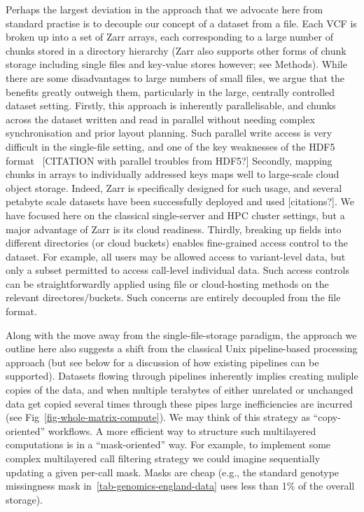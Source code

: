 \documentclass[a4paper,num-refs]{oup-contemporary}
\begin{document}
Perhaps the largest deviation in the approach that we advocate here 
from standard practise is to decouple our concept of a dataset from
a file. Each VCF is broken up into a set of Zarr arrays, each 
corresponding to a large number of chunks stored in a directory
hierarchy (Zarr also supports other forms of chunk storage 
including single files and key-value stores however; see Methods).
While there are some disadvantages to large numbers of small files,
we argue that the benefits greatly outweigh them, particularly 
in the large, centrally controlled dataset setting. 
Firstly, this approach is inherently parallelisable, and chunks across the 
dataset written and read in parallel without needing complex 
synchronisation and prior layout planning. 
Such parallel write access is very difficult 
in the single-file setting, and one of the key weaknesses 
of the HDF5 format~\citep{folk2011overview} [CITATION with 
parallel troubles from HDF5?]
Secondly, mapping chunks in arrays to individually addressed
keys maps well to large-scale cloud object storage. Indeed,
Zarr is specifically designed for such usage, and 
several petabyte scale datasets have been successfully deployed
and used [citations?].
We have focused here on the classical single-server and 
HPC cluster settings, but a major advantage of Zarr is 
its cloud readiness.
Thirdly, breaking up fields into different directories (or 
cloud buckets) enables fine-grained access control to the 
dataset. For example, all users may be allowed access to
variant-level data, but only a subset permitted to access
call-level individual data. Such access controls can be 
straightforwardly applied using file or cloud-hosting 
methods on the relevant directores/buckets. Such concerns
are entirely decoupled from the file format.

Along with the move away from the single-file-storage paradigm,
the approach we outline here also suggests a shift from 
the classical Unix pipeline-based processing approach 
(but see below for a discussion of how existing pipelines can
be supported). Datasets flowing through pipelines inherently 
implies creating muliple copies of the data, and when 
multiple terabytes of either unrelated or unchanged data 
get copied several times through these pipes large inefficiencies 
are incurred (see Fig~\ref{fig-whole-matrix-compute}). 
We may think of this strategy as ``copy-oriented'' workflows.
A more efficient way to structure such multilayered computations
is in a  ``mask-oriented'' way. For example, to implement some
complex multilayered call filtering strategy we could imagine sequentially
updating a given per-call mask. Masks are cheap (e.g., the 
standard genotype missingness mask in~\ref{tab-genomics-england-data}
uses less than 1\% of the overall storage).
\end{document}
